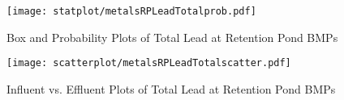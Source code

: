         \begin{figure}[hb]   %
            \centering
            \texttt{[image: statplot/metalsRPLeadTotalprob.pdf]}
            \caption{Box and Probability Plots of Total Lead at Retention Pond BMPs}
        \end{figure}         %
        
        
        \begin{figure}[hb]   %
            \centering
            \texttt{[image: scatterplot/metalsRPLeadTotalscatter.pdf]}
            \caption{Influent vs. Effluent Plots of Total Lead at Retention Pond BMPs}
        \end{figure}         %
        \clearpage
        